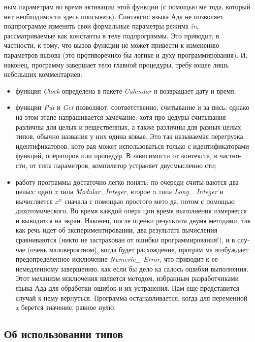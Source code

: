 \documentclass{mai_book}
\begin{document}
ным параметрам во время активации этой функции (с помощью ме­
тода, который нет необходимости здесь описывать). Синтаксис языка
Ада не позволяет подпрограмме изменять свои формальные параметры
режима {\it in}, рассматриваемые как константы в теле подпрограммы. Это
приводит, в частности, к тому, что вызов функции не может привести
к изменению параметров вызова (это противоречило бы логике и духу
программирования).
И, наконец, программу завершает тело главной процедуры, требу­
ющее лишь небольших комментариев:

\begin{itemize}
\item функция {\it Clock} определена в пакете {\it Calendar} и возвращает дату и
время;
\item функции {\it Put} и {\it Get} позволяют, соответственно, считывание и за­
пись; однако на этом этапе напрашивается замечание: хотя про­
цедуры считывания различны для целых и вещественных, а также
различны для разных целых типов, обычно названия у них одина­
ковые. Это так называемая перегрузка идентификаторов, кото­
рая может использоваться только с идентификаторами функций,
операторов или процедур. В зависимости от контекста, в частно­
сти, от типа параметров, компилятор устраняет двусмысленно­
сти;
\item работу программы достаточно легко понять: по очереди считы­
ваются два целых: одно {\it x} типа {\it Modular\_Integer}, второе {\it n} типа
{\it Long\_ Integer} и вычисляется {\it $x^n$} сначала с помощью простого мето­
да, потом с помощью дихотомического. Во время каждой опера­
ции время выполнения измеряется и выводится на экран. Наконец,
после оценки результата двумя методами, так как речь идет об
экспериментировании, два результата вычисления сравниваются
(никто не застрахован от ошибки программирования!), и в слу­
чае (очень маловероятном), когда будет расхождение, програм­
ма возбуждает предопределенное исключение {\it Numeric\_ Error}, что
приводит к ее немедленному завершению, как если бы дело ка­
салось ошибки выполнения. Этот механизм исключения является
методом, избранным разработчиками языка Ада для обработки
ошибок и их устранения. Нам еще представится случай к нему
вернуться. Программа останавливается, когда для переменной {\it x}
берется значение, равное нулю.
\end{itemize}
\newpage

\subsection{Об использовании типов}
\end{document}

